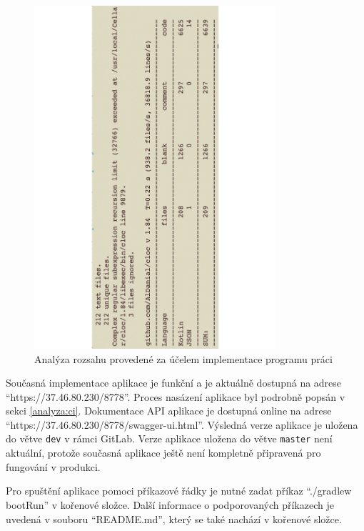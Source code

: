         \begin{figure}\centering
        	   \includegraphics[angle=-90, width=0.8\textwidth]{pdfs/CodeAmountImpl2}
        	   \caption[Analýza kódu implementace]{Analýza rozsahu provedené za účelem implementace programu práci}\label{image:code-count-main}
        \end{figure}
        
        Současná implementace aplikace je funkční a je aktuálně dostupná na adrese \enquote{https://37.46.80.230/8778}. Proces nasázení aplikace byl podrobně popsán v sekci \ref{analyza:ci}. Dokumentace API aplikace je dostupná online na adrese \enquote{https://37.46.80.230/8778/swagger-ui.html}. Výsledná verze aplikace je uložena do větve \verb|dev| v rámci GitLab.
        Verze aplikace uložena do větve \verb|master| není aktuální, protože současná aplikace ještě není kompletně připravená pro fungování v produkci.
        
        Pro spuštění aplikace pomoci příkazové řádky je nutné zadat příkaz \enquote{./gradlew bootRun} v kořenové složce. Další informace o podporovaných příkazech je uvedená v souboru \enquote{README.md}, který se také nachází v kořenové složce. 
        
